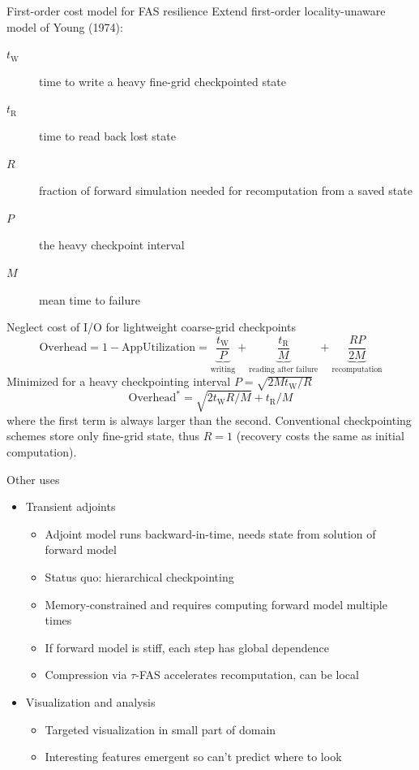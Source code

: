 \documentclass{beamer}
\newcommand{\timeR}{t_{\mathrm{R}}}
\newcommand{\timeW}{t_{\mathrm{W}}}
\begin{document}
\begin{frame}{First-order cost model for FAS resilience}
  Extend first-order locality-unaware model of Young (1974):
  \begin{description}
  \item[$\timeW$] time to write a heavy fine-grid checkpointed state
  \item[$\timeR$] time to read back lost state
  \item[$R$] fraction of forward simulation needed for recomputation from a saved state
  \item[$P$] the heavy checkpoint interval
  \item[$M$] mean time to failure
  \end{description}
  Neglect cost of I/O for lightweight coarse-grid checkpoints
  \begin{equation*}\label{eq:overhead}
    \text{Overhead} = 1 - \text{AppUtilization} = \underbrace{\frac{\timeW}{P}}_{\text{writing}}
    + \underbrace{\frac{\timeR}{M}}_{\text{reading after failure}}
    + \underbrace{\frac{R P}{2M}}_{\text{recomputation}}
  \end{equation*}
  Minimized for a heavy checkpointing interval $P = \sqrt{2 M \timeW / R}$
  \begin{equation*}\label{eq:minoverhead}
    \text{Overhead}^* = \sqrt{2 \timeW R / M} + \timeR / M
  \end{equation*}
  where the first term is always larger than the second.
  Conventional checkpointing schemes store only fine-grid state, thus $R=1$ (recovery costs the same as initial computation).
\end{frame}

\begin{frame}{Other uses}
  \begin{itemize}
  \item Transient adjoints
    \begin{itemize}
    \item Adjoint model runs backward-in-time, needs state from solution of forward model
    \item Status quo: hierarchical checkpointing
    \item Memory-constrained and requires computing forward model multiple times
    \item If forward model is stiff, each step has global dependence
    \item Compression via $\tau$-FAS accelerates recomputation, can be local
    \end{itemize}
  \item Visualization and analysis
    \begin{itemize}
    \item Targeted visualization in small part of domain
    \item Interesting features emergent so can't predict where to look
    \end{itemize}
  \end{itemize}
\end{frame}
\end{document}
